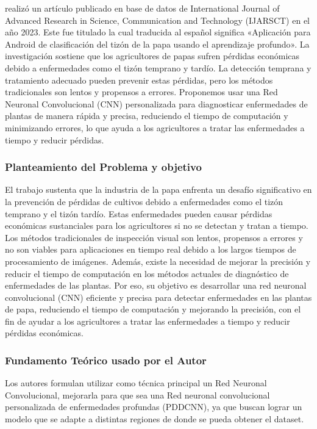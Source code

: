 \citeauthor{antecedente6} realizó un artículo publicado en base de datos de International Journal of Advanced Research in Science, Communication and Technology (IJARSCT) en el año 2023. Este fue titulado  la cual traducida al español significa «Aplicación para Android de clasificación del tizón de la papa usando el aprendizaje profundo». La investigación sostiene que los agricultores de papas sufren pérdidas económicas debido a enfermedades como el tizón temprano y tardío. La detección temprana y tratamiento adecuado pueden prevenir estas pérdidas, pero los métodos tradicionales son lentos y propensos a errores. Proponemos usar una Red Neuronal Convolucional (CNN) personalizada para diagnosticar enfermedades de plantas de manera rápida y precisa, reduciendo el tiempo de computación y minimizando errores, lo que ayuda a los agricultores a tratar las enfermedades a tiempo y reducir pérdidas.

\subsubsection{Planteamiento del Problema y objetivo }
El trabajo sustenta que la industria de la papa enfrenta un desafío significativo en la prevención de pérdidas de cultivos debido a enfermedades como el tizón temprano y el tizón tardío. Estas enfermedades pueden causar pérdidas económicas sustanciales para los agricultores si no se detectan y tratan a tiempo. Los métodos tradicionales de inspección visual son lentos, propensos a errores y no son viables para aplicaciones en tiempo real debido a los largos tiempos de procesamiento de imágenes. Además, existe la necesidad de mejorar la precisión y reducir el tiempo de computación en los métodos actuales de diagnóstico de enfermedades de las plantas. Por eso, su objetivo es desarrollar una red neuronal convolucional (CNN) eficiente y precisa para detectar enfermedades en las plantas de papa, reduciendo el tiempo de computación y mejorando la precisión, con el fin de ayudar a los agricultores a tratar las enfermedades a tiempo y reducir pérdidas económicas. 

\subsubsection{Fundamento Teórico usado por el Autor}

Los autores formulan utilizar como técnica principal un Red Neuronal Convolucional, mejorarla para que sea una Red neuronal convolucional personalizada de enfermedades profundas (PDDCNN), ya que buscan lograr un modelo que se adapte a distintas regiones de donde se pueda obtener el dataset.



